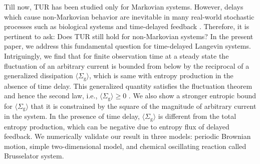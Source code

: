 \documentclass[pre,
twocolumn,
]{revtex4-1}
\theoremstyle{definition}
\theoremstyle{definition}
\newcommand{\mrm}{\mathrm}
\newcommand{\avg}[1]{\langle #1\rangle}
\newcommand{\inl}[1]{$ #1 $}
\begin{document}
Till now, TUR has been studied only for Markovian systems.
However, delays which cause non-Markovian behavior are inevitable in many real-world stochastic processes such as biological systems \cite{Bratsun.2005.PNAS,Gupta.2013.PRL} and time-delayed feedback \cite{Kim.1999.PRL,Masoller.2003.PRL,Lichtner.2012.PRE}.
Therefore, it is pertinent to ask: Does TUR still hold for non-Markovian systems?
In the present paper, we address this fundamental question for time-delayed Langevin systems.
Intriguingly, we find that for finite observation time at a steady state the fluctuation of an arbitrary current is bounded from below by the reciprocal of a generalized dissipation \inl{\avg{\Sigma_{\mrm{g}}}}, which is same with entropy production in the absence of time delay.
This generalized quantity satisfies the fluctuation theorem and hence the second law, i.e., \inl{\avg{\Sigma_{\mrm{g}}}\ge 0} \cite{Jiang.2011.PRE}.
We also show a stronger entropic bound for \inl{\avg{\Sigma_{\mrm{g}}}} that it is constrained by the square of the magnitude of arbitrary current in the system.
In the presence of time delay, \inl{\avg{\Sigma_{\mrm{g}}}} is different from the total entropy production, which can be negative due to entropy flux of delayed feedback.
We numerically validate our result in three models: periodic Brownian motion, simple two-dimensional model, and chemical oscillating reaction called Brusselator system.
\end{document}
